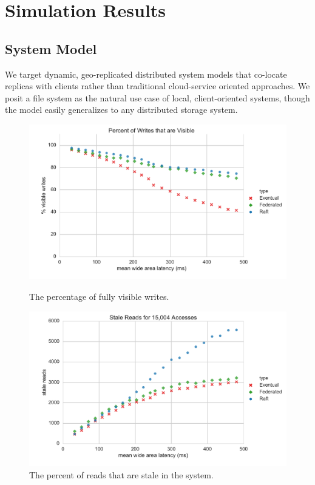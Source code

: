 \documentclass[10pt,conference,letterpaper]{IEEEtran}
\begin{document}
\section{Simulation Results}
\label{sec:results}

\subsection{System Model}

We target dynamic, geo-replicated distributed system models that co-locate replicas with
clients rather than traditional cloud-service oriented approaches.
We posit a file system as the natural use case of
local, client-oriented systems, though the model easily generalizes to any
distributed storage system.

\begin{figure}[t]
    \centering
      \includegraphics[width=\linewidth]{figures/latency/percent_visible_writes}
      \caption{The percentage of fully visible writes.}\label{fig:visible_writes}
    \endminipage\hfill
      \includegraphics[width=\linewidth]{figures/latency/stale_reads}
      \caption{The percent of reads that are stale in the system.}\label{fig:latency_stale_reads}
    \endminipage
\end{figure}
\end{document}
